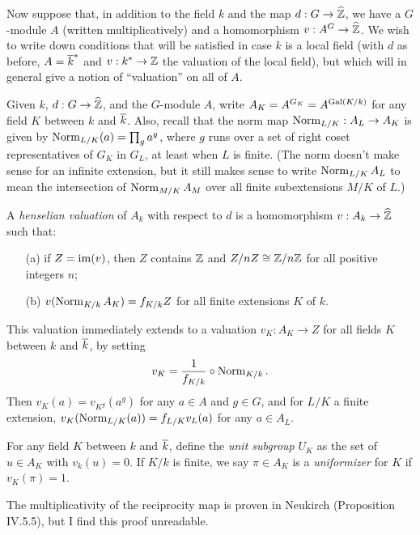 Now suppose that, in addition to the field $k$ and the map $d: G \to \widehat{\mathbb{Z}}$,
we have a $G$-module $A$ (written multiplicatively) and a homomorphism
$v: A^G \to \widehat{\mathbb{Z}}$. We wish to write down conditions that will be
satisfied in case $k$ is a local field (with $d$ as before, $A = \overline{k}^*$
and $v: k^* \to \mathbb{Z}$ the valuation of the local field), but which will
in general give a notion of ``valuation'' on all of $A$.

Given $k$, $d: G \to \widehat{\mathbb{Z}}$, and the $G$-module $A$, write
$A_K = A^{G_K} = A^{\operatorname{Gal}(K/k)}$ for any field $K$ between $k$ and $\overline{k}$.
Also, recall that the norm map $\operatorname{Norm}_{L/K}: A_L \to A_K$
is given by $\operatorname{Norm}_{L/K}(a) = \prod_g a^g$, where $g$ runs over a set
of right coset representatives of $G_K$ in $G_L$, at least when $L$ is
finite. (The norm doesn't make sense for an infinite extension, but it
still makes sense to write $\operatorname{Norm}_{L/K} A_L$ to mean the intersection
of $\operatorname{Norm}_{M/K} A_M$ over all finite subextensions $M/K$ of $L$.)

A \emph{henselian valuation} of $A_k$ with respect to $d$ is a homomorphism
$v: A_k \to \widehat{\mathbb{Z}}$ such that:
\begin{enumerate}
\item[(a)] if $Z = \operatorname{im}(v)$, then $Z$ contains $\mathbb{Z}$ and $Z/nZ \cong
\mathbb{Z}/n\mathbb{Z}$ for all positive integers $n$;
\item[(b)] $v(\operatorname{Norm}_{K/k} A_K) = f_{K/k} Z$ for all finite extensions $K$
of $k$.
\end{enumerate}
This valuation immediately extends to a valuation $v_K: A_K \to Z$ for all
fields $K$ between $k$ and $\overline{k}$, by setting
\[
v_K = \frac{1}{f_{K/k}} \circ \operatorname{Norm}_{K/k}.
\]
Then $v_{K}(a) = v_{K^g}(a^g)$ for any $a \in A$ and $g \in G$,
and for $L/K$ a finite extension,
$v_K(\operatorname{Norm}_{L/K}(a)) = f_{L/K} v_L(a)$ for any $a \in A_L$.

For any field $K$ between $k$ and $\overline{k}$,
define the \emph{unit subgroup} $U_K$ as the set of $u \in A_K$ with
$v_k(u) = 0$. If $K/k$ is finite, we say $\pi \in A_K$ is a \emph{uniformizer} for $K$
if $v_K(\pi) = 1$.


 The multiplicativity of the reciprocity map is proven 
in Neukirch (Proposition IV.5.5), but I find this proof unreadable.


